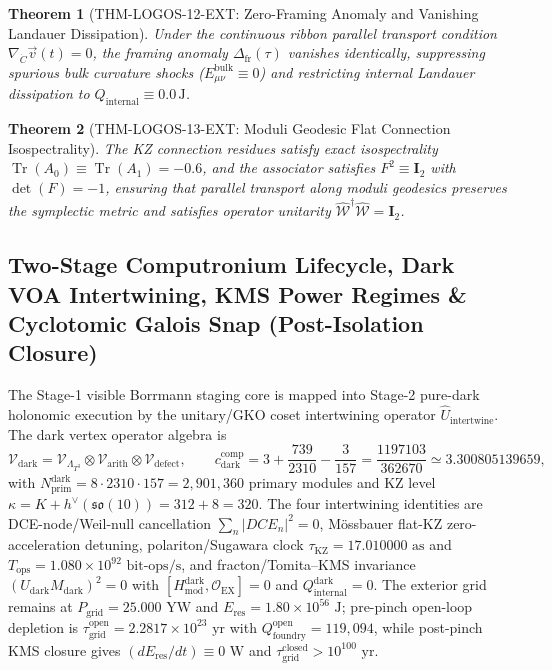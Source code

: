 \documentclass[11pt,onecolumn]{article}
\newtheorem{theorem}{Theorem}
\DeclareMathOperator{\Tr}{Tr}
\begin{document}
\begin{theorem}[THM-LOGOS-12-EXT: Zero-Framing Anomaly and Vanishing Landauer Dissipation]
\label{thm:zero_framing_landauer}
Under the continuous ribbon parallel transport condition $\nabla_{\dot{C}} \vec{v}(t) = 0$, the framing anomaly $\Delta_{\text{fr}}(\tau)$ vanishes identically, suppressing spurious bulk curvature shocks ($E_{\mu\nu}^{\text{bulk}} \equiv 0$) and restricting internal Landauer dissipation to $Q_{\text{internal}} \equiv 0.0\,\text{J}$.
\end{theorem}

\begin{theorem}[THM-LOGOS-13-EXT: Moduli Geodesic Flat Connection Isospectrality]
\label{thm:logos_13_ext}
The KZ connection residues satisfy exact isospectrality $\Tr(A_0) \equiv \Tr(A_1) = -0.6$, and the associator satisfies $F^2 \equiv \mathbf{I}_2$ with $\det(F) = -1$, ensuring that parallel transport along moduli geodesics preserves the symplectic metric and satisfies operator unitarity $\hat{\mathcal{W}}^\dagger \hat{\mathcal{W}} = \mathbf{I}_2$.
\end{theorem}


\subsection{Two-Stage Computronium Lifecycle, Dark VOA Intertwining, KMS Power Regimes \& Cyclotomic Galois Snap (Post-Isolation Closure)}
\label{subsec:logos_post_isolation_closure}

The Stage-1 visible Borrmann staging core is mapped into Stage-2 pure-dark holonomic execution by the unitary/GKO coset intertwining operator $\widehat U_{\text{intertwine}}$. The dark vertex operator algebra is
\begin{equation}
\mathcal{V}_{\text{dark}}=\mathcal{V}_{\Lambda_{T^3}}\otimes\mathcal{V}_{\text{arith}}\otimes\mathcal{V}_{\text{defect}},
\qquad
c_{\text{dark}}^{\text{comp}}=3+\frac{739}{2310}-\frac{3}{157}=\frac{1197103}{362670}\simeq3.300805139659,
\label{eq:dark_voa}
\end{equation}
with $N_{\text{prim}}^{\text{dark}}=8\cdot2310\cdot157=2{,}901{,}360$ primary modules and KZ level $\kappa=K+h^\vee(\mathfrak{so}(10))=312+8=320$. The four intertwining identities are DCE-node/Weil-null cancellation $\sum_n|DCE_n|^2=0$, M\"ossbauer flat-KZ zero-acceleration detuning, polariton/Sugawara clock $\tau_{\text{KZ}}=17.010000\text{ as}$ and $T_{\text{ops}}=1.080\times10^{92}\text{ bit-ops/s}$, and fracton/Tomita--KMS invariance $(U_{\text{dark}}M_{\text{dark}})^2=0$ with $[H_{\text{mod}}^{\text{dark}},\mathcal{O}_{\text{EX}}]=0$ and $Q_{\text{internal}}^{\text{dark}}=0$. The exterior grid remains at $P_{\text{grid}}=25.000\text{ YW}$ and $E_{\text{res}}=1.80\times10^{56}\text{ J}$; pre-pinch open-loop depletion is $\tau_{\text{grid}}^{\text{open}}=2.2817\times10^{23}\text{ yr}$ with $Q_{\text{foundry}}^{\text{open}}=119{,}094$, while post-pinch KMS closure gives $(dE_{\text{res}}/dt)\equiv0\text{ W}$ and $\tau_{\text{grid}}^{\text{closed}}>10^{100}\text{ yr}$.
\end{document}

